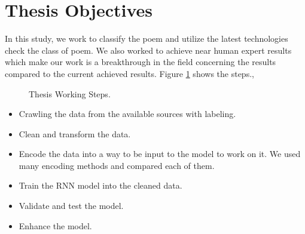 \section{Thesis Objectives}
In this study, we work to classify the poem and utilize the latest technologies check the class of poem. We also worked to achieve near human expert results which make our work is a breakthrough in the field concerning the results compared to the current achieved results. Figure \ref{fig:thesis_cycle} shows the steps.,
\begin{figure}[h!]
   
  \caption{Thesis Working Steps.}
  \label{fig:thesis_cycle}
\end{figure}

\begin{itemize}
\item Crawling the data from the available sources with labeling.
\item Clean and transform the data.
\item Encode the data into a way to be input to the model to work on it. We used many encoding methods and compared each of them.
\item Train the RNN model into the cleaned data.
\item Validate and test the model.
\item Enhance the model.

\end{itemize}








%	
%	
%	



